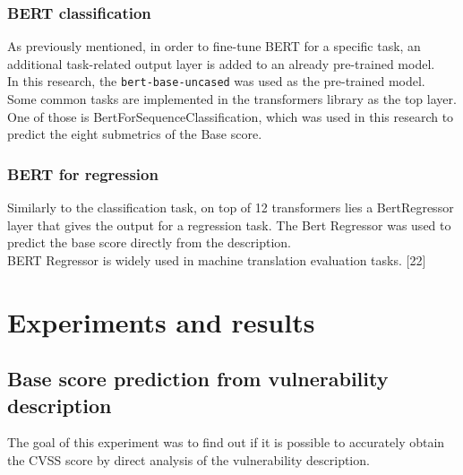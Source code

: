 \documentclass[times, utf8, zavrsni, english]{fer}
\begin{document}
\subsection{BERT classification}
As previously mentioned, in order to fine-tune BERT for a specific task, an additional task-related output layer is added to an already pre-trained model.\\
In this research, the \texttt{bert-base-uncased} was used as the pre-trained model.\\
Some common tasks are implemented in the transformers library as the top layer. One of those is BertForSequenceClassification, which was used in this research to predict the eight submetrics of the Base score. 
\subsection{BERT for regression}
Similarly to the classification task, on top of 12 transformers lies a BertRegressor layer that gives the output for a regression task. The Bert Regressor was used to predict the base score directly from the description.\\
BERT Regressor is widely used in machine translation evaluation tasks. [22]

\chapter{Experiments and results}
\section{Base score prediction from vulnerability description}
The goal of this experiment was to find out if it is possible to accurately obtain the CVSS score by direct analysis of the vulnerability description.
\end{document}
